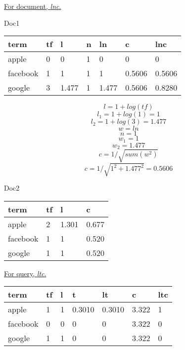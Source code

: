 \documentclass[11pt,a4paper]{report}
\begin{document}
\begin{multicols*}{2}
\noindent \underline{For document, \textit{lnc}.}

\noindent Doc1

\begin{center}
\begin{tabular}{| l | l | l | l | l | l | l|}
    \hline
    term     & tf & l & n & ln & c & lnc\\
    \hline
    apple    & 0 & 0 & 1 & 0 & 0 & 0\\
    facebook & 1 & 1 & 1 & 1 & 0.5606 & 0.5606\\
    google   & 3 & 1.477 & 1 & 1.477 & 0.5606 & 0.8280\\
    \hline
\end{tabular}
$$
l = 1 + log(tf) $$
$$l_1 = 1 + log(1) = 1$$
$$l_2 = 1 + log(3) = 1.477$$
\linebreak
$$ w = ln $$
$$ n = 1 $$
$$w_1 = 1$$
$$w_2 = 1.477 $$
\linebreak
$$c = 1 / \sqrt{sum(w^2)} $$
$$c = 1/\sqrt{1^2 + 1.477^2} = 0.5606  $$
\end{center}

\noindent Doc2

\begin{center}
\begin{tabular}{|l | l | l | l |}
    \hline
    term     & tf & l & c \\
    \hline
    apple    & 2 & 1.301 & 0.677 \\
    facebook & 1 & 1 & 0.520\\
    google   & 1 & 1 & 0.520\\
    \hline
\end{tabular}
\end{center}

\noindent \underline{For query, \textit{ltc}.}
\begin{center}
\begin{tabular}{|l | l | l | l | l | l |l |}
    \hline
    term     & tf & l & t & lt & c & ltc\\
    \hline
    apple    & 1 & 1 & 0.3010 & 0.3010 & 3.322 & 1\\
    facebook & 0 & 0 & 0 & 0 & 3.322 & 0\\
    google   & 1 & 1 & 0 & 0 & 3.322 & 0\\
    \hline
\end{tabular}
\end{center}


\end{multicols*}
\end{document}
